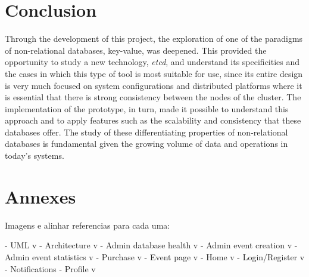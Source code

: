 \documentclass[screen,review]{acmart}
\begin{document}
\section{Conclusion}
Through the development of this project, the exploration of one of the paradigms of non-relational databases, key-value, was deepened. This provided the opportunity to study a new technology, \textit{etcd}, and understand its specificities and the cases in which this type of tool is most suitable for use, since its entire design is very much focused on system configurations and distributed platforms where it is essential that there is strong consistency between the nodes of the cluster. The implementation of the prototype, in turn, made it possible to understand this approach and to apply features such as the scalability and consistency that these databases offer. The study of these differentiating properties of non-relational databases is fundamental given the growing volume of data and operations in today's systems.

\section{Annexes}

Imagens e alinhar referencias para cada uma:

- UML v
- Architecture v
- Admin database health v
- Admin event creation v
- Admin event statistics v
- Purchase v
- Event page v
- Home v
- Login/Register v
- Notifications
- Profile v


\nocite{*}
\def\BibTex{BibTeX}


\end{document}
